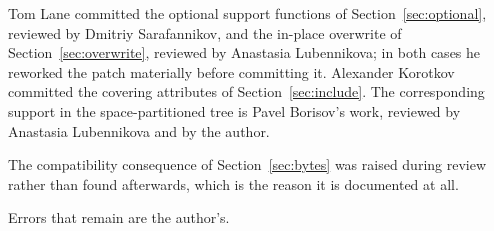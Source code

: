 \documentclass[11pt, a4paper]{article}
\begin{document}

Tom Lane committed the optional support functions of Section~\ref{sec:optional},
reviewed by Dmitriy Sarafannikov, and the in-place overwrite of
Section~\ref{sec:overwrite}, reviewed by Anastasia Lubennikova; in both cases he
reworked the patch materially before committing it. Alexander Korotkov committed
the covering attributes of Section~\ref{sec:include}. The corresponding support
in the space-partitioned tree is Pavel Borisov's work, reviewed by Anastasia
Lubennikova and by the author.

The compatibility consequence of Section~\ref{sec:bytes} was raised during
review rather than found afterwards, which is the reason it is documented at all.

Errors that remain are the author's.



\end{document}
